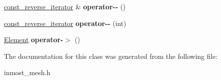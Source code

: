 \begin{DoxyCompactItemize}
\item 
\hypertarget{classINMOST_1_1Storage_1_1reference__array_1_1const__reverse__iterator_af511e62d50470c187b78e2e02b55c2d6}{\hyperlink{classINMOST_1_1Storage_1_1reference__array_1_1const__reverse__iterator}{const\-\_\-reverse\-\_\-iterator} \& {\bfseries operator-\/-\/} ()}\label{classINMOST_1_1Storage_1_1reference__array_1_1const__reverse__iterator_af511e62d50470c187b78e2e02b55c2d6}

\item 
\hypertarget{classINMOST_1_1Storage_1_1reference__array_1_1const__reverse__iterator_a32e78a66fbbbb09b19a990ea5caae9c2}{\hyperlink{classINMOST_1_1Storage_1_1reference__array_1_1const__reverse__iterator}{const\-\_\-reverse\-\_\-iterator} {\bfseries operator-\/-\/} (int)}\label{classINMOST_1_1Storage_1_1reference__array_1_1const__reverse__iterator_a32e78a66fbbbb09b19a990ea5caae9c2}

\item 
\hypertarget{classINMOST_1_1Storage_1_1reference__array_1_1const__reverse__iterator_a41050b9776acf46dc919fceb36d409da}{\hyperlink{classINMOST_1_1Element}{Element} {\bfseries operator-\/$>$} ()}\label{classINMOST_1_1Storage_1_1reference__array_1_1const__reverse__iterator_a41050b9776acf46dc919fceb36d409da}

\end{DoxyCompactItemize}


The documentation for this class was generated from the following file\-:\begin{DoxyCompactItemize}
\item 
inmost\-\_\-mesh.\-h\end{DoxyCompactItemize}
